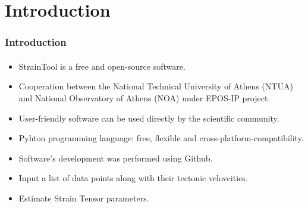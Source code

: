 \section{Introduction}
 

\begin{frame}
  \frametitle{Introduction}
  \framesubtitle{}
  \label{ch1:intro}
  
  \begin{itemize}
    \item StrainTool is a free and open-source software.
    
    \item Cooperation between the National Technical University of Athens (NTUA) and National Observatory of Athens (NOA) under EPOS-IP project.
    
    \item User-friendly software can be used directly by the scientific community.
    
    \item Pyhton programming language: free, flexible and cross-platform-compatibility.
    
    \item Software's development was performed using Github.
    
    \item Input a list of data points along with their tectonic velovcities.
    
    \item Estimate Strain Tensor parameters.
  \end{itemize}
  
  
\end{frame}
\note{}




